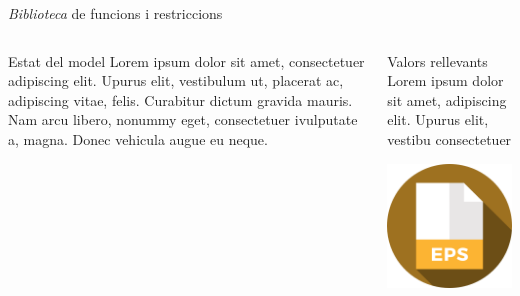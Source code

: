 \documentclass[twocolumn]{beamer}
\begin{document}
\begin{frame}{\textit{Biblioteca} de funcions i restriccions}
\begin{columns}[t]
	\begin{column}{.5\textwidth}
		\begin{block}{Estat del model}
			Lorem ipsum dolor sit amet,
			consectetuer adipiscing elit. Upurus elit, vestibulum ut,
			placerat ac, adipiscing vitae,
			felis. Curabitur dictum gravida
			mauris. Nam arcu libero,
			nonummy eget, consectetuer ivulputate a, magna. Donec
			vehicula augue eu neque.
		\end{block}
	\end{column}
	\begin{column}{.5\textwidth}
		\begin{block}{Valors rellevants}
			Lorem ipsum dolor sit amet,
			adipiscing elit. Upurus elit, vestibu
			consectetuer 
		\end{block}
		\includegraphics[width=3.5cm]{eps}
	\end{column}
\end{columns}
\end{frame}
\end{document}
